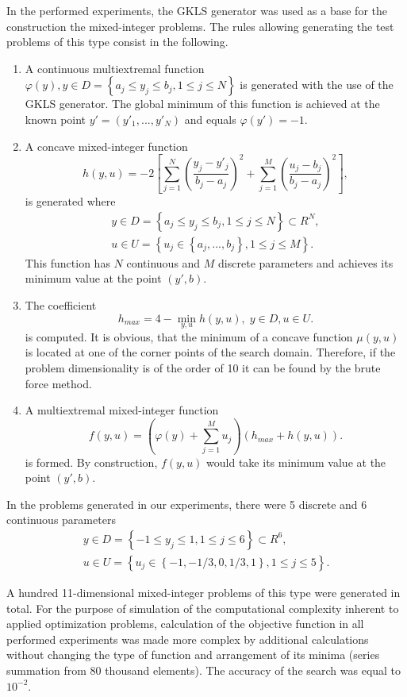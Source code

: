 \documentclass[runningheads]{llncs}
\begin{document}
In the performed experiments, the GKLS generator was used as a base for the construction the
mixed-integer problems. The rules allowing generating the test problems of this type consist in
the following.

\begin{enumerate}
	\item A continuous multiextremal function $\varphi(y), y\in D = \left\{ a_j\leq
y_j\leq b_j, 1\leq j \leq N \right\}$ is generated with the use of the GKLS generator. The global
minimum of this function is achieved at the known point $y'=(y'_1,...,y'_N)$ and equals
$\varphi(y')=-1$.
	\item A concave mixed-integer function
	\[
			h(y,u) = -2 \left[ \sum_{j=1}^N \left( \frac{y_j - y'_j}{b_j-a_j}
\right)^2 + \sum_{j=1}^M \left( \frac{u_j - b_j}{b_j-a_j} \right)^2 \right],
	\]
	is generated where
	\begin{gather}
	y\in D = \left\{ a_j\leq y_j\leq b_j, 1\leq j \leq N \right\} \subset R^N,\nonumber \\
	u\in U = \left\{ u_j \in  \left\{a_j, ..., b_j \right\}, 1\leq j \leq M \right\}.\nonumber
	\end{gather}
	This function has $N$ continuous and $M$ discrete parameters and achieves its
minimum value at the point $(y',b)$.
	\item The coefficient
	\[
	h_{max} = 4 - \min_{y,u} h(y,u) , \; y\in D, u \in U.
	\]
	is computed.
It is obvious, that the minimum of a concave function $\mu(y,u)$ is located at one of the corner
points of the search domain. Therefore, if the problem dimensionality is of the order of 10 it can
be found by the brute force method.
	\item A multiextremal mixed-integer function
	\[
	f(y,u) = \left(\varphi(y) + \sum_{j=1}^M{u_j}\right)\left(h_{max} + h(y,u)\right).
	\]
	is formed.
By construction, $f(y,u)$ would take its minimum value at the point $(y',b)$.

\end{enumerate}


In the problems generated in our experiments, there were 5 discrete and 6 continuous
parameters
	\begin{gather}
	y\in D = \left\{ -1 \leq y_j\leq 1, 1\leq j \leq 6 \right\} \subset R^6,\nonumber \\
	u\in U = \left\{ u_j \in  \left\{-1, -1/3, 0, 1/3, 1 \right\}, 1\leq j \leq 5 \right\}.\nonumber
	\end{gather}

A hundred 11-dimensional mixed-integer problems of this type were generated in total.
For the purpose of simulation of the computational complexity inherent to
applied optimization problems, calculation of the objective function in all performed
experiments was made more complex by additional calculations without changing the type
of function and arrangement of its minima (series summation from 80 thousand elements).
The accuracy of the search was equal to $10^{-2}$.%
\end{document}
